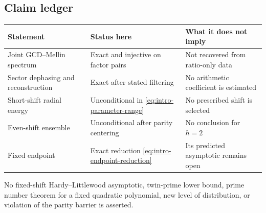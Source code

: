 \subsection{Claim ledger}

\begin{center}
\begin{tabular}{@{}p{}p{}p{}@{}}
\toprule
Statement & Status here & What it does not imply\\
\midrule
Joint GCD--Mellin spectrum
 & Exact and injective on factor pairs
 & Not recovered from ratio-only data\\
Sector dephasing and reconstruction
 & Exact after stated filtering
 & No arithmetic coefficient is estimated\\
Short-shift radial energy
 & Unconditional in \eqref{eq:intro-parameter-range}
 & No prescribed shift is selected\\
Even-shift ensemble
 & Unconditional after parity centering
 & No conclusion for $h=2$\\
Fixed endpoint
 & Exact reduction \eqref{eq:intro-endpoint-reduction}
 & Its predicted asymptotic remains open\\
\bottomrule
\end{tabular}
\end{center}

No fixed-shift Hardy--Littlewood asymptotic, twin-prime lower bound,
prime number theorem for a fixed quadratic polynomial, new level of
distribution, or violation of the parity barrier is asserted.
